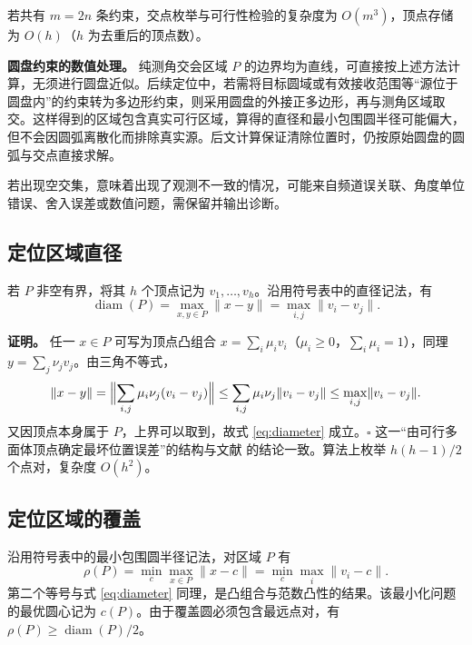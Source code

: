 \documentclass[UTF8,a4paper,zihao=-4,fontset=none]{ctexart}
\begin{document}
若共有 \(m=2n\) 条约束，交点枚举与可行性检验的复杂度为 \(O(m^3)\)，顶点存储为 \(O(h)\)（\(h\) 为去重后的顶点数）。

\textbf{圆盘约束的数值处理。} 纯测角交会区域 \(P\) 的边界均为直线，可直接按上述方法计算，无须进行圆盘近似。后续定位中，若需将目标圆域或有效接收范围等“源位于圆盘内”的约束转为多边形约束，则采用圆盘的外接正多边形，再与测角区域取交。这样得到的区域包含真实可行区域，算得的直径和最小包围圆半径可能偏大，但不会因圆弧离散化而排除真实源。后文计算保证清除位置时，仍按原始圆盘的圆弧与交点直接求解。

若出现空交集，意味着出现了观测不一致的情况，可能来自频道误关联、角度单位错误、舍入误差或数值问题，需保留并输出诊断。

\subsection{定位区域直径}

若 \(P\) 非空有界，将其 \(h\) 个顶点记为 \(v_1,\dots,v_h\)。沿用符号表中的直径记法，有
\begin{equation}
  \operatorname{diam}(P)=\max_{x,y\in P}\lVert x-y\rVert=\max_{i,j}\lVert v_i-v_j\rVert .
  \label{eq:diameter}
\end{equation}

\textbf{证明。} 任一 \(x\in P\) 可写为顶点凸组合 \(x=\sum_i\mu_iv_i\)（\(\mu_i\ge0\)，\(\sum_i\mu_i=1\)），同理 \(y=\sum_j\nu_jv_j\)。由三角不等式，
\begin{equation}
  \lVert x-y\rVert
  =\Bigl\lVert\sum_{i,j}\mu_i\nu_j(v_i-v_j)\Bigr\rVert
  \le\sum_{i,j}\mu_i\nu_j\lVert v_i-v_j\rVert
  \le\max_{i,j}\lVert v_i-v_j\rVert .
\end{equation}
又因顶点本身属于 \(P\)，上界可以取到，故式 \eqref{eq:diameter} 成立。\(\square\) 
这一“由可行多面体顶点确定最坏位置误差”的结构与文献 \cite{Gholami2015} 的结论一致。算法上枚举 \(h(h-1)/2\) 个点对，复杂度 \(O(h^2)\)。

\subsection{定位区域的覆盖}

沿用符号表中的最小包围圆半径记法，对区域 \(P\) 有
\begin{equation}
  \rho(P)=\min_c\max_{x\in P}\lVert x-c\rVert
  =\min_c\max_i\lVert v_i-c\rVert .
  \label{eq:mincircle}
\end{equation}
第二个等号与式 \eqref{eq:diameter} 同理，是凸组合与范数凸性的结果。该最小化问题的最优圆心记为 \(c(P)\)。由于覆盖圆必须包含最远点对，有 \(\rho(P)\ge\operatorname{diam}(P)/2\)。
\end{document}

